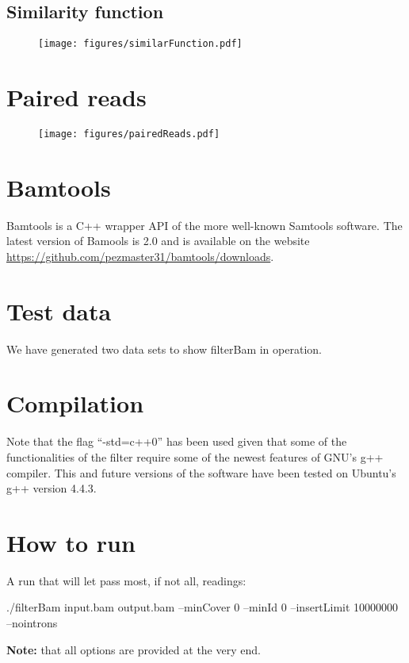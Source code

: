 \documentclass[11pt]{article}
\begin{document}
{\subsection{Similarity function}

\begin{figure}
  \begin{center}
    \texttt{[image: figures/similarFunction.pdf]}
  \end{center}
\end{figure}



\section{Paired reads}

\begin{figure}
  \begin{center}
    \texttt{[image: figures/pairedReads.pdf]}
  \end{center}
\end{figure}


\section{Bamtools}
Bamtools is a C++ wrapper API of the more well-known Samtools software. The latest version of Bamools 
is 2.0 and is available on the website \url{https://github.com/pezmaster31/bamtools/downloads}. 

\section{Test data}
We have generated two data sets to show filterBam in operation. 

\section{Compilation}

Note that the flag ``-std=c++0'' has been used given that some of the functionalities of the filter require 
some of the newest features of GNU's g++ compiler. This and future versions of the software have been tested 
on Ubuntu's g++ version 4.4.3.

\section{How to run}
A run that will let pass most, if not all, readings: 
\begin{flushleft}
./filterBam input.bam output.bam --minCover 0 --minId 0  --insertLimit 10000000 --nointrons
\end{flushleft}
\textbf{Note:} that all options are provided at the very end.

}
\end{document}
